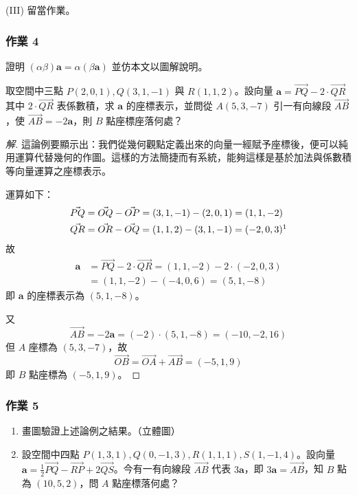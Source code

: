 (III) 留當作業。

\subsubsection*{作業 4}
證明 $(\alpha\beta)\mathbf{a} = \alpha(\beta\mathbf{a})$ 並仿本文以圖解說明。

\begin{example}[論例 6]
取空間中三點 $P(2, 0, 1), Q(3, 1, -1)$ 與 $R(1, 1, 2)$。設向量 $\mathbf{a} = \vec{PQ} - 2\cdot\vec{QR}$ 其中 $2\cdot\vec{QR}$ 表係數積，求 $\mathbf{a}$ 的座標表示，並問從 $A(5, 3, -7)$ 引一有向線段 $\vec{AB}$，使 $\vec{AB} = -2\mathbf{a}$，則 $B$ 點座標座落何處？
\end{example}

\begin{proof}[解]
這論例要顯示出：我們從幾何觀點定義出來的向量一經賦予座標後，便可以純用運算代替幾何的作圖。這樣的方法簡捷而有系統，能夠這樣是基於加法與係數積等向量運算之座標表示。

運算如下：
\begin{align*}
\vec{PQ} &= \vec{OQ} - \vec{OP} = (3, 1, -1) - (2, 0, 1) = (1, 1, -2) \\
\vec{QR} &= \vec{OR} - \vec{OQ} = (1, 1, 2) - (3, 1, -1) = (-2, 0, 3)\footnotemark
\end{align*}
故
\begin{align*}
\mathbf{a} &= \vec{PQ} - 2\cdot\vec{QR} = (1, 1, -2) - 2\cdot(-2, 0, 3) \\
&= (1, 1, -2) - (-4, 0, 6) = (5, 1, -8)
\end{align*}
即 $\mathbf{a}$ 的座標表示為 $(5, 1, -8)$。

又
\[ \vec{AB} = -2\mathbf{a} = (-2)\cdot(5, 1, -8) = (-10, -2, 16) \]
但 $A$ 座標為 $(5, 3, -7)$，故
\[ \vec{OB} = \vec{OA} + \vec{AB} = (-5, 1, 9) \]
即 $B$ 點座標為 $(-5, 1, 9)$。\qedhere
\end{proof}

\subsubsection*{作業 5}
\begin{enumerate}[label=(\roman*), leftmargin=2em]
  \item 畫圖驗證上述論例之結果。（立體圖）
  \item 設空間中四點 $P(1, 3, 1), Q(0, -1, 3), R(1, 1, 1), S(1, -1, 4)$。設向量 $\mathbf{a} = \frac{1}{2}\vec{PQ} - \vec{RP} + 2\vec{QS}$。今有一有向線段 $\vec{AB}$ 代表 $3\mathbf{a}$，即 $3\mathbf{a} = \vec{AB}$，知 $B$ 點為 $(10, 5, 2)$，問 $A$ 點座標落何處？
\end{enumerate}

